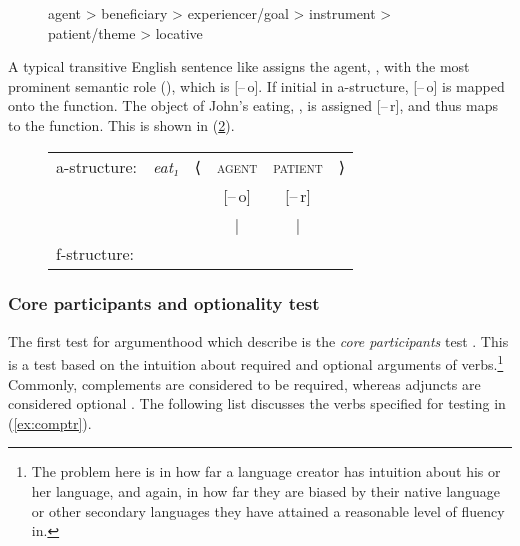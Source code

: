 \begin{figure}[h]
\ex\label{ex:themhier2}%
	agent > beneficiary > experiencer/goal > instrument > patient/theme >
	locative
\xe
\end{figure}

A typical transitive English sentence like  assigns
the agent, , with the most prominent semantic role (\thetaroof), which
is [–\,o]. If initial in a-structure, [–\,o] is mapped onto the \Subj{}
function. The object of John's eating, , is assigned [–\,r], and
thus maps to the \Obj{} function. This is shown in (\ref{ex:engactive}).

\begin{figure}[h]
\ex\label{ex:engactive}
\begin{tabular}[t]{l >{\itshape}l l c c r}
a-structure:
	& eat₁
	& ⟨
	& \textsc{agent}
	& \textsc{patient}
	& ⟩
	\\
%
	& %
	& %
	& [–\,o]
	& [–\,r]
	& %
	\\

%
	& %
	& %
	& |
	& |
	& %
	\\

f-structure:
	& %
	& %
	& \Subj
	& \Obj
	& %
	\\
\end{tabular}
\xe
\end{figure}

\subsubsection{Core participants and optionality test}

The first test for argumenthood which \citet{needhamtoivonen2011} describe is
the \emph{core participants} test \citep[404]{needhamtoivonen2011}. This is a
test based on the intuition about required and optional arguments of
verbs.\footnote{The problem here is in how far a language creator has intuition
about his or her language, and again, in how far they are biased by their
native language or other secondary languages they have attained a reasonable
level of fluency in.} Commonly, complements are considered to be required,
whereas adjuncts are considered optional \citep[405--407]{needhamtoivonen2011}.
The following list discusses the verbs specified for testing in
(\ref{ex:comptr}).

